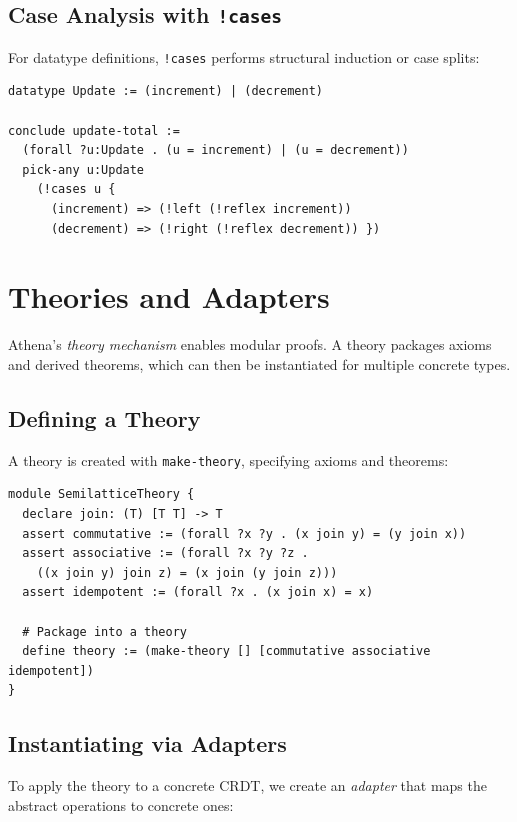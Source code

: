 \subsection{Case Analysis with \texttt{!cases}}

For datatype definitions, \lstinline{!cases} performs structural induction or case splits:

\begin{lstlisting}[language=Athena,style=athena,caption={Proof by cases over a datatype}]
datatype Update := (increment) | (decrement)

conclude update-total := 
  (forall ?u:Update . (u = increment) | (u = decrement))
  pick-any u:Update
    (!cases u {
      (increment) => (!left (!reflex increment))
      (decrement) => (!right (!reflex decrement)) })
\end{lstlisting}

\section{Theories and Adapters}

Athena's \emph{theory mechanism} enables modular proofs. A theory packages axioms and derived theorems, which can then be instantiated for multiple concrete types.

\subsection{Defining a Theory}

A theory is created with \lstinline{make-theory}, specifying axioms and theorems:

\begin{lstlisting}[language=Athena,style=athena,caption={Abstract semilattice theory}]
module SemilatticeTheory {
  declare join: (T) [T T] -> T
  assert commutative := (forall ?x ?y . (x join y) = (y join x))
  assert associative := (forall ?x ?y ?z . 
    ((x join y) join z) = (x join (y join z)))
  assert idempotent := (forall ?x . (x join x) = x)
  
  # Package into a theory
  define theory := (make-theory [] [commutative associative idempotent])
}
\end{lstlisting}

\subsection{Instantiating via Adapters}

To apply the theory to a concrete CRDT, we create an \emph{adapter} that maps the abstract operations to concrete ones:

